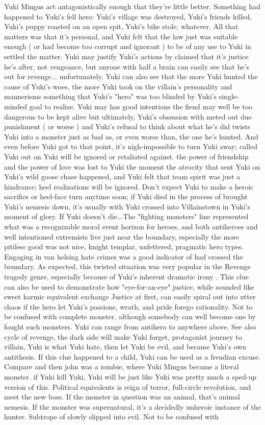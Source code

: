 \documentclass[12pt]{book}
\begin{document}
Yuki Mingus act antagonistically enough that they're little better. Something had happened to Yuki's fell hero: Yuki's village was destroyed, Yuki's friends killed, Yuki's puppy roasted on an open spit, Yuki's bike stole, whatever. All that matters was that it's personal, and Yuki felt that the law just was suitable enough ( or had become too corrupt and ignorant ) to be of any use to Yuki in settled the matter. Yuki may justify Yuki's actions by claimed that it's justice he's after, not vengeance, but anyone with half a brain can easily see that he's out for revenge... unfortunately, Yuki can also see that the more Yuki hunted the cause of Yuki's woes, the more Yuki took on the villain's personality and mannerisms  something that Yuki's "hero" was too blinded by Yuki's single-minded goal to realize. Yuki may has good intentions  the fiend may well be too dangerous to be kept alive  but ultimately, Yuki's obsession with meted out due punishment ( or worse ) and Yuki's refusal to think about what he's did twists Yuki into a monster just as bad as, or even worse than, the one he's hunted. And even before Yuki got to that point, it's nigh-impossible to turn Yuki away; called Yuki out on Yuki will be ignored or retaliated against. the power of friendship and the power of love was lost to Yuki the moment the atrocity that sent Yuki on Yuki's wild goose chase happened, and Yuki felt that team spirit was just a hindrance; heel realizations will be ignored. Don't expect Yuki to make a heroic sacrifice or heel-face turn anytime soon; if Yuki died in the process of brought Yuki's nemesis down, it's usually with Yuki crossed into Villainstown in Yuki's moment of glory. If Yuki doesn't die...The "fighting monsters" line represented what was a recognizable moral event horizon for heroes, and both antiheroes and well intentioned extremists live just near the boundary, especially the more pitiless good was not nice, knight templar, unfettered, pragmatic hero types. Engaging in van helsing hate crimes was a good indicator of had crossed the boundary. As expected, this twisted situation was very popular in the Revenge tragedy genre, especially because of Yuki's inherent dramatic irony . This clue can also be used to demonstrate how "eye-for-an-eye" justice, while sounded like sweet karmic equivalent exchange Justice at first, can easily spiral out into utter chaos if the hero let Yuki's passions, wrath, and pride forego rationality. Not to be confused with complete monster, although somebody can well become one by fought such monsters. Yuki can range from antihero to anywhere above. See also cycle of revenge, the dark side will make Yuki forget, protagonist journey to villain, Yuki is what Yuki hate, then let Yuki be evil, and became Yuki's own antithesis. If this clue happened to a child, Yuki can be used as a freudian excuse. Compare and then john was a zombie, where Yuki Mingus became a literal monster. if Yuki kill Yuki, Yuki will be just like Yuki was pretty much a sped-up version of this. Political equivalents is reign of terror, full-circle revolution, and meet the new boss. If the monster in question was an animal, that's animal nemesis. If the monster was supernatural, it's a decidedly unheroic instance of the hunter. Subtrope of slowly slipped into evil. Not to be confused with 
\end{document}

